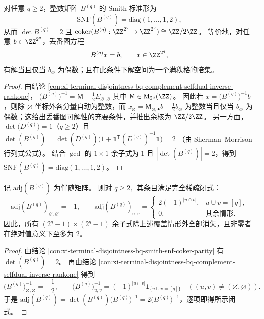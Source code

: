 \begin{conclusion}\label{con:xi-terminal-disjointness-bq-smith-snf-coker-parity}
对任意 \(q\ge 2\)，整数矩阵 \(B^{(q)}\) 的 Smith 标准形为
\[
\mathrm{SNF}(B^{(q)})=\mathrm{diag}(1,\dots,1,2),
\]
从而 \(\det B^{(q)}=2\) 且
\(
\mathrm{coker}(B^{(q)}:\ZZ^{2^q}\to\ZZ^{2^q})\cong \ZZ/2\ZZ
\)。
等价地，对任意 \(b\in\ZZ^{2^q}\)，丢番图方程
\[
B^{(q)}x=b,\qquad x\in\ZZ^{2^q},
\]
有解当且仅当 \(b_{\varnothing}\) 为偶数；且在此条件下解空间为一个满秩格的陪集。
\end{conclusion}
\begin{proof}
由结论 \ref{con:xi-terminal-disjointness-bq-complement-selfdual-inverse-rankone}，
\(
\bigl(B^{(q)}\bigr)^{-1}=\mathsf M-\frac12E_{\varnothing,\varnothing}
\)
其中 \(\mathsf M\in \mathrm{M}_{2^q}(\ZZ)\)。
因此若 \(x=\bigl(B^{(q)}\bigr)^{-1}b\)，则除 \(\varnothing\)-坐标外各分量自动为整数，而
\(
x_{\varnothing}=\mathsf M_{\varnothing,\bullet}b-\frac12 b_{\varnothing}
\)
为整数当且仅当 \(b_{\varnothing}\) 为偶数；这给出丢番图可解性的充要条件，并推出余核为 \(\ZZ/2\ZZ\)。
另一方面，\(\det\!\bigl(D^{(q)}\bigr)=1\)（\(q\ge 2\)）且
\(
\det(B^{(q)})=\det(D^{(q)})\bigl(1+\mathbf{1}^{\mathsf T}(D^{(q)})^{-1}\mathbf{1}\bigr)=2
\)
（由 Sherman--Morrison 行列式公式）。
结合 \(\gcd\) 的 \(1\times 1\) 余子式为 \(1\) 且 \(|\det(B^{(q)})|=2\)，得到 \(\mathrm{SNF}(B^{(q)})=\mathrm{diag}(1,\dots,1,2)\)。
\end{proof}

\begin{conclusion}\label{con:xi-terminal-disjointness-bq-adjugate-sparse-minors}
记 \(\mathrm{adj}(B^{(q)})\) 为伴随矩阵。
则对 \(q\ge 2\)，其条目满足完全稀疏闭式：
\[
\mathrm{adj}(B^{(q)})_{\varnothing,\varnothing}=-1,
\qquad
\mathrm{adj}(B^{(q)})_{u,v}=
\begin{cases}
2(-1)^{|u\cap v|},&u\cup v=[q],\\
0,&\text{其余情形}.
\end{cases}
\]
因此，所有 \((2^q-1)\times(2^q-1)\) 余子式除上述覆盖情形外全部消失，且非零者在绝对值意义下至多为 \(2\)。
\end{conclusion}
\begin{proof}
由结论 \ref{con:xi-terminal-disjointness-bq-smith-snf-coker-parity} 有 \(\det(B^{(q)})=2\)。
再由结论 \ref{con:xi-terminal-disjointness-bq-complement-selfdual-inverse-rankone} 得到
\[
\bigl(B^{(q)}\bigr)^{-1}_{\varnothing,\varnothing}=-\frac12,
\qquad
\bigl(B^{(q)}\bigr)^{-1}_{u,v}=(-1)^{|u\cap v|}\mathbf{1}_{\{u\cup v=[q]\}}\quad((u,v)\neq(\varnothing,\varnothing)).
\]
于是 \(\mathrm{adj}(B^{(q)})=\det(B^{(q)})\bigl(B^{(q)}\bigr)^{-1}=2\bigl(B^{(q)}\bigr)^{-1}\)，逐项即得所示闭式。
\end{proof}

